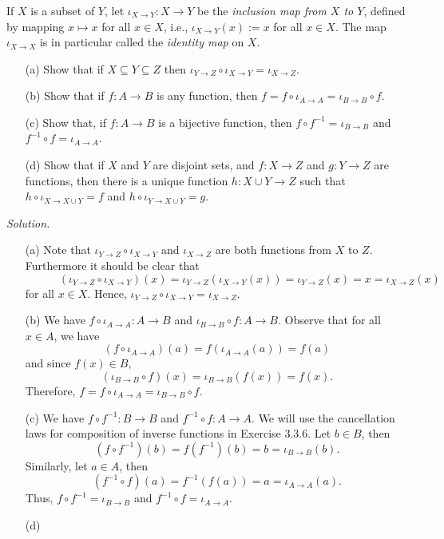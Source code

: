 \documentclass{amsart}
\theoremstyle{definition}
\begin{document}
\subsubsection{} If $X$ is a subset of $Y$, let $\iota_{X\to Y}:X\to Y$ be the \textit{inclusion map  from $X$ to $Y$}, defined by mapping $x\mapsto x$ for all $x\in X$, i.e., $\iota_{X\to Y}(x):=x$ for all $x\in X$. The map $\iota_{X\to X}$ is in particular called the \textit{identity map} on $X$. 
\begin{enumerate}
\item[(a)] Show that if $X\subseteq Y\subseteq Z$ then $\iota_{Y\to Z}\circ\iota_{X\to Y}=\iota_{X\to Z}$. 
\item[(b)] Show that if $f:A\to B$ is any function, then $f=f\circ\iota_{A\to A}=\iota_{B\to B}\circ f$.
\item[(c)] Show that, if $f:A\to B$ is a bijective function, then $f\circ f^{-1}=\iota_{B\to B}$ and $f^{-1}\circ f=\iota_{A\to A}$. 
\item[(d)] Show that if $X$ and $Y$ are disjoint sets, and $f:X\to Z$ and $g:Y\to Z$ are functions, then there is a unique function $h:X\cup Y\to Z$ such that $h\circ \iota_{X\to X\cup Y}=f$ and $h\circ \iota_{Y\to X\cup Y}=g$. \\
\end{enumerate}

\textit{Solution.} 
\begin{enumerate}
\item[(a)] Note that $\iota_{Y\to Z}\circ\iota_{X\to Y}$ and $\iota_{X\to Z}$ are both functions from $X$ to $Z$. Furthermore it should be clear that 
\[
\qquad\quad (\iota_{Y\to Z}\circ\iota_{X\to Y})(x)=\iota_{Y\to Z}(\iota_{X\to Y}(x))=\iota_{Y\to Z}(x)=x=\iota_{X\to Z}(x)
\]
for all $x\in X$. Hence, $\iota_{Y\to Z}\circ\iota_{X\to Y}=\iota_{X\to Z}$.
\item[(b)] We have $f\circ\iota_{A\to A}:A\to B$ and $\iota_{B\to B}\circ f:A\to B$. Observe that for all $x\in A$, we have
\[
(f\circ\iota_{A\to A})(a)=f(\iota_{A\to A}(a))=f(a)
\]
and since $f(x)\in B$,
\[
(\iota_{B\to B}\circ f)(x)=\iota_{B\to B}(f(x))=f(x).
\]
Therefore, $f=f\circ\iota_{A\to A}=\iota_{B\to B}\circ f$.
\item[(c)] We have $f\circ f^{-1}:B\to B$ and $f^{-1}\circ f:A\to A$. We will use the cancellation laws for composition of inverse functions in Exercise 3.3.6. Let $b\in B$, then
\[
(f\circ f^{-1})(b)=f(f^{-1})(b)=b=\iota_{B\to B}(b).
\]
Similarly, let $a\in A$, then
\[
(f^{-1}\circ f)(a)=f^{-1}(f(a))=a=\iota_{A\to A}(a).
\]
Thus, $f\circ f^{-1}=\iota_{B\to B}$ and $f^{-1}\circ f=\iota_{A\to A}$.
\item[(d)] 



\end{enumerate}
\end{document}
